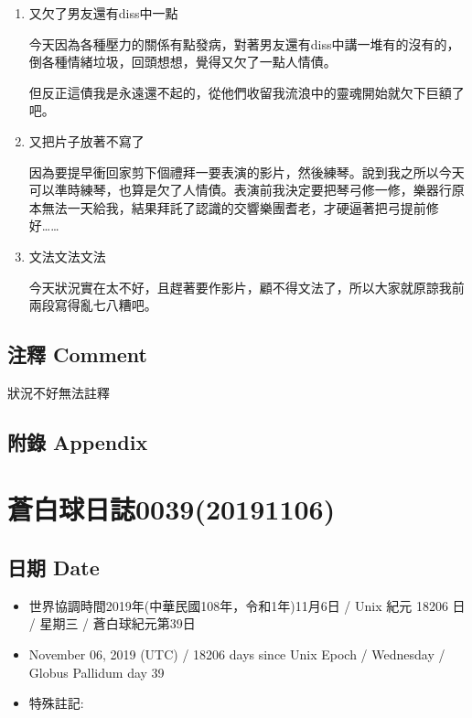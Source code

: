 \documentclass[a5paper, 12pt
]{book}
\providecommand{\tightlist}{%
  \setlength{\itemsep}{0pt}\setlength{\parskip}{0pt}}
\begin{document}
\begin{enumerate}
\def\labelenumi{\arabic{enumi}.}
\item
  又欠了男友還有diss中一點

  今天因為各種壓力的關係有點發病，對著男友還有diss中講一堆有的沒有的，倒各種情緒垃圾，回頭想想，覺得又欠了一點人情債。

  但反正這債我是永遠還不起的，從他們收留我流浪中的靈魂開始就欠下巨額了吧。
\item
  又把片子放著不寫了

  因為要提早衝回家剪下個禮拜一要表演的影片，然後練琴。說到我之所以今天可以準時練琴，也算是欠了人情債。表演前我決定要把琴弓修一修，樂器行原本無法一天給我，結果拜託了認識的交響樂團耆老，才硬逼著把弓提前修好\ldots\ldots{}
\item
  文法文法文法

  今天狀況實在太不好，且趕著要作影片，顧不得文法了，所以大家就原諒我前兩段寫得亂七八糟吧。
\end{enumerate}

\hypertarget{ux6ce8ux91cb-comment-31}{%
\subsection{注釋 Comment}\label{ux6ce8ux91cb-comment-31}}

狀況不好無法註釋

\hypertarget{ux9644ux9304-appendix-30}{%
\subsection{附錄 Appendix}\label{ux9644ux9304-appendix-30}}

\hypertarget{ux84bcux767dux7403ux65e5ux8a8c003920191106}{%
\section{蒼白球日誌0039(20191106)}\label{ux84bcux767dux7403ux65e5ux8a8c003920191106}}

\hypertarget{ux65e5ux671f-date-38}{%
\subsection{日期 Date}\label{ux65e5ux671f-date-38}}

\begin{itemize}
\tightlist
\item
  世界協調時間2019年(中華民國108年，令和1年)11月6日 / Unix 紀元 18206 日
  / 星期三 / 蒼白球紀元第39日
\item
  November 06, 2019 (UTC) / 18206 days since Unix Epoch / Wednesday /
  Globus Pallidum day 39
\item
  特殊註記:
\end{itemize}
\end{document}
